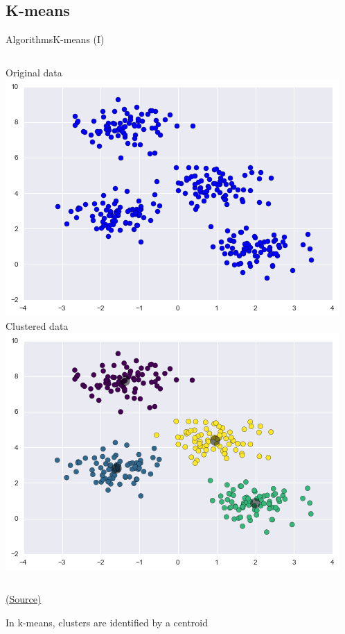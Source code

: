 \documentclass[10pt,compress]{beamer} %
\begin{document}
\subsection{K-means}
\begin{frame}{Algorithms}{K-means (I)}
    \begin{columns}
       \centering Original data\\
		\includegraphics[width=\textwidth]{figs/kmeans-1.png}
       \centering Clustered data\\
		\includegraphics[width=\textwidth]{figs/kmeans-2.png}
    \end{columns}

    \centering \tiny{\href{https://jakevdp.github.io/PythonDataScienceHandbook/05.11-k-means.html}{(Source)}}

    \normalsize
    \begin{flushleft}
    In k-means, clusters are identified by a \alert{centroid}
    \end{flushleft}
\end{frame}
\end{document}
